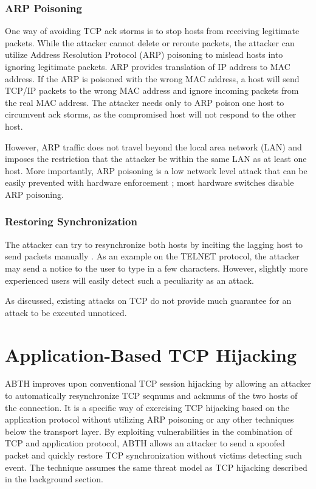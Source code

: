 \documentclass{sig-alternate}
\begin{document}
\subsubsection{ARP Poisoning}

One way of avoiding TCP ack storms is to stop hosts from receiving legitimate packets.
While the attacker cannot delete or reroute packets, the attacker can utilize Address Resolution Protocol (ARP) poisoning to mislead hosts into ignoring legitimate packets.
ARP provides translation of IP address to MAC address.
If the ARP is poisoned with the wrong MAC address, a host will send TCP/IP packets to the wrong MAC address and ignore incoming packets from the real MAC address.
The attacker needs only to ARP poison one host to circumvent ack storms, as the compromised host will not respond to the other host.

However, ARP traffic does not travel beyond the local area network (LAN) and imposes the restriction that the attacker be within the same LAN as at least one host.
More importantly, ARP poisoning is a low network level attack that can be easily prevented with hardware enforcement \cite{spangler:sniffing}; most hardware switches disable ARP poisoning.

\subsubsection{Restoring Synchronization}

The attacker can try to resynchronize both hosts by inciting the lagging host to send packets manually \cite{lam:resync}.
As an example on the TELNET protocol, the attacker may send a notice to the user to type in a few characters.
However, slightly more experienced users will easily detect such a peculiarity as an attack.

As discussed, existing attacks on TCP do not provide much guarantee for an attack to be executed unnoticed.

\section{Application-Based TCP Hijacking}

ABTH improves upon conventional TCP session hijacking by allowing an attacker to automatically resynchronize TCP seqnums and acknums of the two hosts of the connection.
It is a specific way of exercising TCP hijacking based on the application protocol without utilizing ARP poisoning or any other techniques below the transport layer.
By exploiting vulnerabilities in the combination of TCP and application protocol, ABTH allows an attacker to send a spoofed packet and quickly restore TCP synchronization without victims detecting such event.
The technique assumes the same threat model as TCP hijacking described in the background section.
\end{document}
